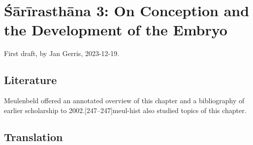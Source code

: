 
\chapter{Śārīrasthāna 3:  On Conception and the Development of the 
Embryo}

First draft, by Jan Gerris, 2023-12-19. 

\section{Literature} 

Meulenbeld offered an annotated overview of this chapter and a
bibliography of earlier scholarship to
2002.[247--247]{meul-hist}  
\citet[ch 8]{das-2003} also
studied topics of this chapter.

\section{Translation}



